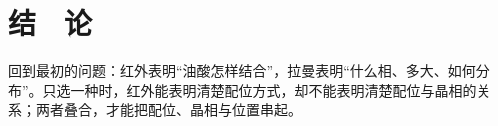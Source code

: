 \section{结　论}

回到最初的问题：红外表明“油酸怎样结合”，拉曼表明“什么相、多大、如何分布”。只选一种时，红外能表明清楚配位方式，却不能表明清楚配位与晶相的关系；两者叠合，才能把配位、晶相与位置串起。
